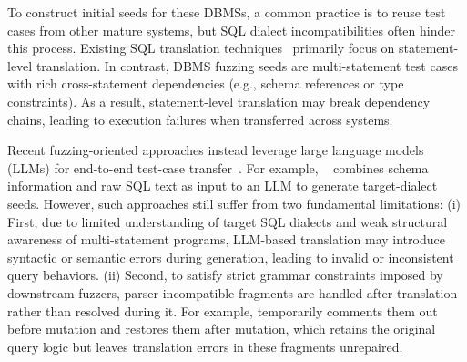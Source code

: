 \documentclass[conference]{IEEEtran}
\begin{document}
To construct initial seeds for these DBMSs, a common practice is to reuse test cases from other mature systems, but SQL dialect incompatibilities often hinder this process.
Existing SQL translation techniques~\cite{sqlglot,jooq} primarily focus on statement-level translation. In contrast, DBMS fuzzing seeds are multi-statement test cases with rich cross-statement dependencies (e.g., schema references or type constraints). As a result, statement-level translation may break dependency chains, leading to execution failures when transferred across systems.

Recent fuzzing-oriented approaches instead leverage large language models (LLMs) for end-to-end test-case transfer~\cite{fu2024sedar}. For example, \sedar{}~\cite{fu2024sedar} combines schema information and raw SQL text as input to an LLM to generate target-dialect seeds. However, such approaches still suffer from two fundamental limitations: 
(i) First, due to limited understanding of target SQL dialects and weak structural awareness of multi-statement programs, LLM-based translation may introduce syntactic or semantic errors during generation, leading to invalid or inconsistent query behaviors.
(ii) Second, to satisfy strict grammar constraints imposed by downstream fuzzers, parser-incompatible fragments are handled after translation rather than resolved during it. For example, \sedar{} temporarily comments them out before mutation and restores them after mutation, which retains the original query logic but leaves translation errors in these fragments unrepaired.



\end{document}
